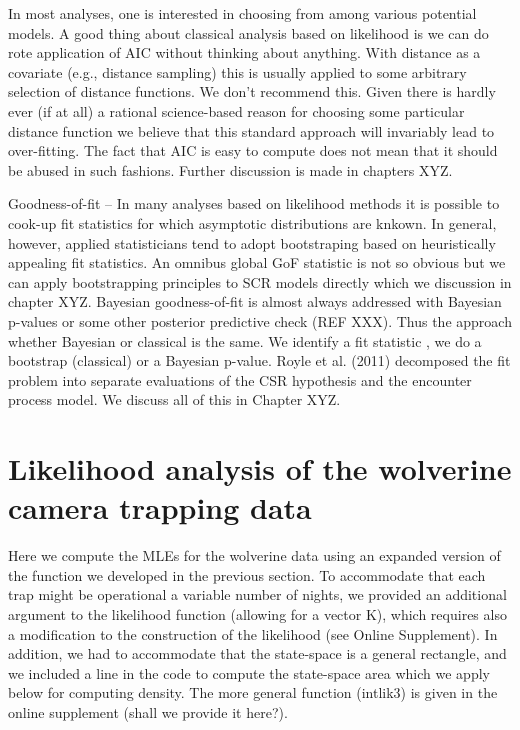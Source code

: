 In most analyses, one is interested in choosing from among various
potential models. A good thing about classical analysis based on
likelihood is we can do rote application of AIC without thinking about
anything. With distance as a covariate (e.g., distance sampling) this
is usually applied to some arbitrary selection of distance
functions. We don’t recommend this. Given there is hardly ever (if at
all) a rational science-based reason for choosing some particular
distance function we believe that this standard approach will
invariably lead to over-fitting. The fact that AIC is easy to compute
does not mean that it should be abused in such fashions. Further
discussion is made in chapters XYZ.

Goodness-of-fit – In many analyses based on likelihood methods it is
possible to cook-up fit statistics for which asymptotic distributions
are knkown. In general, however, applied statisticians tend to adopt
bootstraping based on heuristically appealing fit statistics. An
omnibus global GoF statistic is not so obvious but we can apply
bootstrapping principles to SCR models directly which we discussion in
chapter XYZ.  Bayesian goodness-of-fit is almost always addressed with
Bayesian p-values or some other posterior predictive check (REF
XXX). Thus the approach whether Bayesian or classical is the same. We
identify a fit statistic , we do a bootstrap (classical) or a Bayesian
p-value.  Royle et al. (2011) decomposed the fit problem into separate
evaluations of the CSR hypothesis and the encounter process model. We
discuss all of this in Chapter XYZ.


\section{Likelihood analysis of the wolverine camera trapping data}

Here we compute the MLEs for the wolverine data using an expanded
version of the function we developed in the previous section. To
accommodate that each trap might be operational a variable number of
nights, we provided an additional argument to the likelihood function
(allowing for a vector K), which requires also a modification to the
construction of the likelihood (see Online Supplement).  In addition,
we had to accommodate that the state-space is a general rectangle, and
we included a line in the code to compute the state-space area which
we apply below for computing density.  The more general function
(intlik3) is given in the online supplement (shall we provide it
here?).

